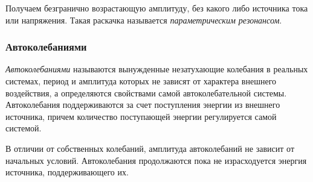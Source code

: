 Получаем безгранично возрастающую амплитуду, без какого либо источника тока или напряжения. Такая раскачка называется \textit{параметрическим резонансом}.

\subsubsection*{Автоколебаниями}


\textit{Автоколебаниями} называются вынужденные незатухающие колебания в реальных системах, период и амплитуда которых не зависят от характера внешнего воздействия, а определяются свойствами самой автоколебательной системы. Автоколебания поддерживаются за счет поступления энергии из внешнего источника, причем количество поступающей энергии регулируется самой системой. 

В отличии от собственных колебаний, амплитуда автоколебаний не зависит от начальных условий. Автоколебания продолжаются пока не израсходуется энергия источника, поддерживающего их.

